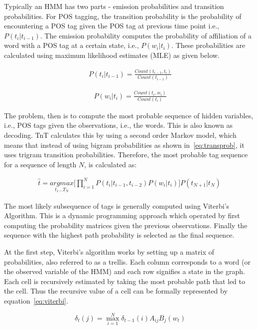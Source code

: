 Typically an HMM has two parts - emission probabilities and transition probabilities. For POS tagging, the transition probability is the probability of encountering a POS tag given the POS tag at previous time point i.e.,  $P(t_i|t_{i-1})$. The emission probability computes the probability of affiliation of a word with a POS tag at a certain state, i.e., $P(w_i|t_i)$. These probabilities are calculated using maximum likelihood estimates (MLE) as given below.

\begin{align}~\label{eq:transprob}
    P(t_i|t_{i-1}) = \frac{Count(t_{i-1},t_i)}{Count(t_{i-1})} 
\end{align}

\begin{align}~\label{eq:emprob}
    P(w_i|t_i) = \frac{Count(t_i,w_i)}{Count(t_i)}
\end{align}
    
The problem, then is to compute the most probable sequence of hidden variables, i.e., POS tags given the observations, i.e., the words. This is also known as decoding. TnT calculates this by using a second order Markov model, which means that instead of using bigram probabilities as shown in~\ref{eq:transprob}, it uses trigram transition probabilities. Therefore, the most probable tag sequence for a sequence of length $N$, is calculated as:

\begin{align}
    \hat{t} = \underset{t_1 ... T_N}{argmax}  \bigg [ \prod_{i=1}^N P(t_i|t_{i-1},t_{i-2}) P(w_i|t_i) \bigg] P(t_{N+1}|t_N)
\end{align}

The most likely subsequence of tags is generally computed using Viterbi's Algorithm. This is a dynamic programming approach which operated by first computing the probability matrices given the previous observations. Finally the sequence with the highest path probability is selected as the final sequence.

At the first step, Viterbi's algorithm works by setting up a matrix of probabilities, also referred to as a trellis. Each column corresponds to a word (or the observed variable of the HMM) and each row signifies a state in the graph. Each cell is recursively estimated by taking the most probable path that led to the cell. Thus the recursive value of a cell can be formally represented by equation~\ref{eq:viterbi}.

\begin{equation}~\label{eq:viterbi}
    \delta_t(j) = \max_{i=1}^{N} \delta_{t-1}(i) A_{ij} B_j(w_t)
\end{equation}

